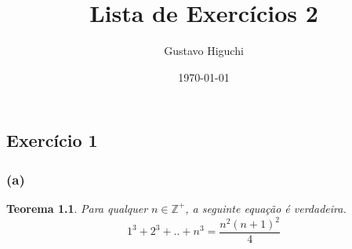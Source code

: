 \documentclass{article}
\title{Lista de Exercícios 2}
\author{Gustavo Higuchi}
\date{\today}
\begin{document}
\maketitle

\tableofcontents
\newpage


\chapter{}

\section{Exercício 1}

\subsection*{(a)}
\newtheorem{teo1}{Teorema}
\begin{teo1}
    Para qualquer $n \in  \mathbb{Z^+}$, a seguinte equação é verdadeira.
	\begin{equation}
		1^3 + 2^3 + .. + n^3 = \dfrac{n^2(n+1)^2}{4}
	\end{equation}	

\end{teo1}
\end{document}
